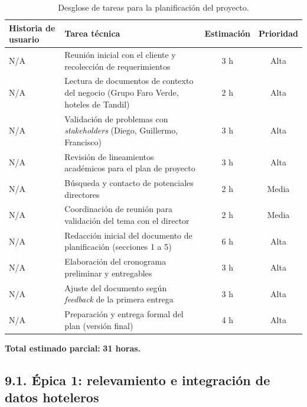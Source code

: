 \documentclass[
11pt, %
]{charter}
\begin{document}
\begin{table}[H]
\centering
\begin{tabularx}{\linewidth}{@{}|X|X|c|c|@{}}
\hline
\rowcolor[HTML]{C0C0C0}
Historia de usuario & Tarea técnica & Estimación & Prioridad \\ \hline
N/A & Reunión inicial con el cliente y recolección de requerimientos & 3 h & Alta \\ \hline
N/A & Lectura de documentos de contexto del negocio (Grupo Faro Verde, hoteles de Tandil) & 2 h & Alta \\ \hline
N/A & Validación de problemas con \textit{stakeholders} (Diego, Guillermo, Francisco) & 3 h & Alta \\ \hline
N/A & Revisión de lineamientos académicos para el plan de proyecto & 3 h & Alta \\ \hline
N/A & Búsqueda y contacto de potenciales directores & 2 h & Media \\ \hline
N/A & Coordinación de reunión para validación del tema con el director & 2 h & Media \\ \hline
N/A & Redacción inicial del documento de planificación (secciones 1 a 5) & 6 h & Alta \\ \hline
N/A & Elaboración del cronograma preliminar y entregables & 3 h & Alta \\ \hline
N/A & Ajuste del documento según \textit{feedback} de la primera entrega & 3 h & Alta \\ \hline
N/A & Preparación y entrega formal del plan (versión final) & 4 h & Alta \\ \hline
\end{tabularx}
\caption{Desglose de tareas para la planificación del proyecto.}
\end{table}
  
\noindent
\textbf{Total estimado parcial:} \textbf{31 horas.}

\subsection*{9.1. Épica 1: relevamiento e integración de datos hoteleros}
 
\end{document}
